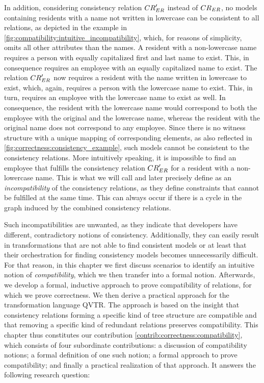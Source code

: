 In addition, considering consistency relation $\consistencyrelation{CR}{ER}'$ instead of $\consistencyrelation{CR}{ER}$, no models containing residents with a name not written in lowercase can be consistent to all relations, as depicted in the example in \autoref{fig:compatibility:intuitive_incompatibility}, which, for reasons of simplicity, omits all other attributes than the names.
A resident with a non-lowercase name requires a person with equally capitalized first and last name to exist.
This, in consequence requires an employee with an equally capitalized name to exist.
The relation $\consistencyrelation{CR}{ER}'$ now requires a resident with the name written in lowercase to exist, which, again, requires a person with the lowercase name to exist.
This, in turn, requires an employee with the lowercase name to exist as well.
In consequence, the resident with the lowercase name would correspond to both the employee with the original and the lowercase name, whereas the resident with the original name does not correspond to any employee.
Since there is no witness structure with a unique mapping of corresponding elements, as also reflected in \autoref{fig:correctness:consistency_example}, such models cannot be consistent to the consistency relations.
More intuitively speaking, it is impossible to find an employee that fulfills the consistency relation $\consistencyrelation{CR}{ER}'$ for a resident with a non-lowercase name.
This is what we will call and later precisely define as an \emph{incompatibility} of the consistency relations, as they define constraints that cannot be fulfilled at the same time.
This can always occur if there is a cycle in the graph induced by the combined consistency relations.

Such incompatibilities are unwanted, as they indicate that developers have different, contradictory notions of consistency.
Additionally, they can easily result in transformations that are not able to find consistent models or at least that their orchestration for finding consistency models becomes unnecessarily difficult.
For that reason, in this chapter we first discuss scenarios to identify an intuitive notion of \emph{compatibility}, which we then transfer into a formal notion.
Afterwards, we develop a formal, inductive approach to prove compatibility of relations, for which we prove correctness.
We then derive a practical approach for the transformation language \gls{QVTR}.
The approach is based on the insight that consistency relations forming a specific kind of tree structure are compatible and that removing a specific kind of redundant relations preserves compatibility.
This chapter thus constitutes our contribution \autoref{contrib:correctness:compatibility}, which consists of four subordinate contributions: a discussion of compatibility notions; a formal definition of one such notion; a formal approach to prove compatibility; and finally a practical realization of that approach.
It answers the following research question:


